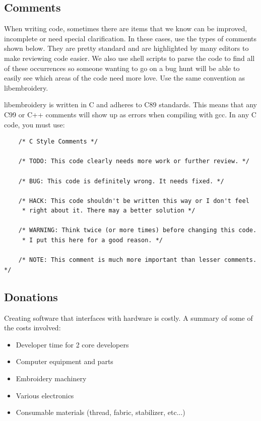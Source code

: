 \documentclass[a4paper, 11pt]{report}
\begin{document}
\subsection{Comments}

When writing code, sometimes there are items that we know can be improved,
incomplete or need special clarification. In these cases, use the types of
comments shown below. They are pretty standard and are highlighted by many editors to
make reviewing code easier. We also use shell scripts to parse the code to find
all of these occurrences so someone wanting to go on a bug hunt will be able to
easily see which areas of the code need more love. Use the same convention
as libembroidery.

libembroidery is written in C and adheres to C89 standards. This means
that any C99 or C++ comments will show up as errors when compiling with
gcc. In any C code, you must use:

\begin{verbatim}
    /* C Style Comments */

    /* TODO: This code clearly needs more work or further review. */

    /* BUG: This code is definitely wrong. It needs fixed. */

    /* HACK: This code shouldn't be written this way or I don't feel
     * right about it. There may a better solution */

    /* WARNING: Think twice (or more times) before changing this code.
     * I put this here for a good reason. */

    /* NOTE: This comment is much more important than lesser comments. */
\end{verbatim}

\subsection{Donations}

Creating software that interfaces with hardware is costly. A summary of some of the costs involved:
     
\begin{itemize}               
\item Developer time for 2 core developers
\item Computer equipment and parts
\item Embroidery machinery
\item Various electronics
\item Consumable materials (thread, fabric, stabilizer, etc...)
\end{itemize}
\end{document}
